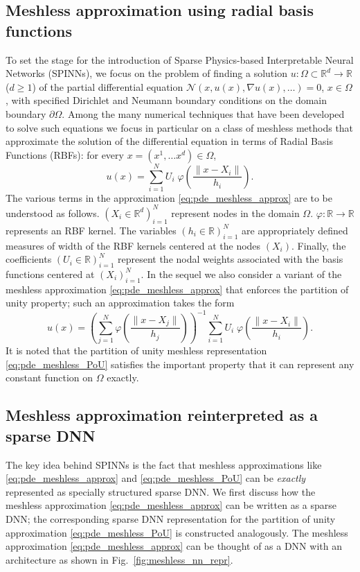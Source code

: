 \documentclass[12pt]{article}
\begin{document}
\subsection{Meshless approximation using radial basis functions}
To set the stage for the introduction of Sparse Physics-based Interpretable Neural Networks (SPINNs), we focus on the problem of finding a solution $u:\Omega \subset \mathbb{R}^d \to \mathbb{R}$ ($d \ge 1$) of the partial differential equation $\mathcal{N}(x, u(x), \nabla u(x), \ldots) = 0$, $x \in \Omega$, with specified Dirichlet and Neumann boundary conditions on the domain boundary $\partial \Omega$. Among the many numerical techniques that have been developed to solve such equations we focus in particular on a class of meshless methods that approximate the solution of the differential equation in terms of Radial Basis Functions (RBFs): for every $x = (x^1, \ldots x^d) \in \Omega$,
\begin{equation} \label{eq:pde_meshless_approx}
u(x) = \sum_{i=1}^N U_i \; \varphi\left(\frac{\lVert x - X_i \rVert}{h_i}\right).
\end{equation}
The various terms in the approximation \eqref{eq:pde_meshless_approx} are to be understood as follows. $(X_i \in \mathbb{R}^d)_{i=1}^N$ represent nodes in the domain $\Omega$. $\varphi:\mathbb{R}\to \mathbb{R}$ represents an RBF kernel. The variables $(h_i \in \mathbb{R})_{i=1}^N$ are appropriately defined measures of width of the RBF kernels centered at the nodes $(X_i)$. Finally, the coefficients $(U_i \in \mathbb{R})_{i=1}^N$ represent the nodal weights associated with the basis functions centered at $(X_i)_{i=1}^N$. In the sequel we also consider a variant of the meshless approximation \eqref{eq:pde_meshless_approx} that enforces the partition of unity property; such an approximation takes the form
\begin{equation} \label{eq:pde_meshless_PoU}
u(x) = \left(\sum_{j=1}^N \varphi\left(\frac{\lVert x - X_j \rVert}{h_j}\right)\right)^{-1}\sum_{i=1}^N U_i  \; \varphi\left(\frac{\lVert x - X_i \rVert}{h_i}\right).
\end{equation}
It is noted that the partition of unity meshless representation \eqref{eq:pde_meshless_PoU} satisfies the important property that it can represent any constant function on $\Omega$ exactly.

\subsection{Meshless approximation reinterpreted as a sparse DNN}
The key idea behind SPINNs is the fact that meshless approximations like \eqref{eq:pde_meshless_approx} and \eqref{eq:pde_meshless_PoU} can be \emph{exactly} represented as specially structured sparse DNN. We first discuss how the meshless approximation \eqref{eq:pde_meshless_approx} can be written as a sparse DNN; the corresponding sparse DNN representation for the partition of unity approximation \eqref{eq:pde_meshless_PoU} is constructed analogously. The meshless approximation \eqref{eq:pde_meshless_approx} can be thought of as a DNN with an architecture as shown in Fig.~\ref{fig:meshless_nn_repr}.
\end{document}
